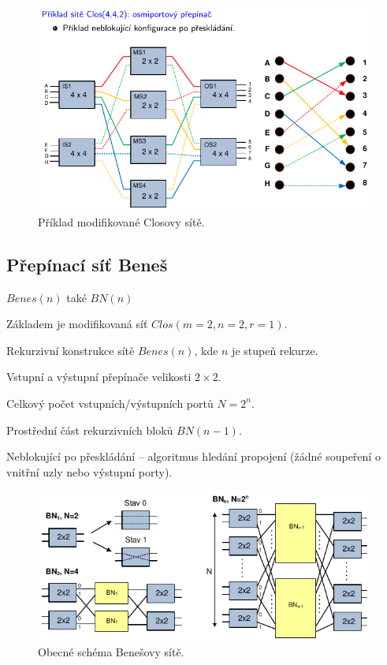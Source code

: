 \begin{figure}[H]
    \centering
    \includegraphics[width=1\linewidth]{clos_modifikovany_priklad.pdf}
    \caption{Příklad modifikované Closovy sítě.}
\end{figure}

\subsection{Přepínací síť Beneš}

$Benes(n)$ také $BN(n)$
\begin{compactitem}
    \item Základem je modifikovaná síť $Clos(m=2, n=2, r=1)$.
    \item Rekurzivní konstrukce sítě $Benes(n)$, kde $n$ je stupeň rekurze.
    \item Vstupní a výstupní přepínače velikosti $2 \times 2$.
    \item Celkový počet vstupních/výstupních portů $N = 2^n$.
    \item Prostřední část rekurzivních bloků $BN(n-1)$.
    \item Neblokující po přeskládání -- algoritmus hledání propojení (žádné soupeření o vnitřní uzly nebo výstupní porty).
\end{compactitem}

\begin{figure}[H]
    \centering
    \includegraphics[width=0.9\linewidth]{benes.pdf}
    \caption{Obecné schéma Benešovy sítě.}
\end{figure}

